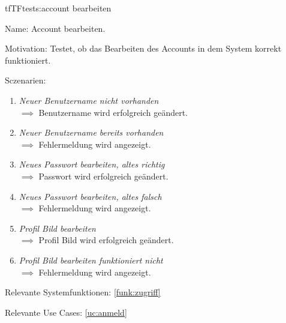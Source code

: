 \begin{description}[leftmargin=5em, style=sameline]

\begin{lhp}{tf}{TF}{tests:account bearbeiten}
	\item [Name:] Account bearbeiten.
	\item [Motivation:] Testet, ob das Bearbeiten des Accounts in dem System korrekt funktioniert.
	\item [Sczenarien:] \hfill
		\begin{enumerate}
			\item \textit{Neuer Benutzername nicht vorhanden} \\ $\implies$ Benutzername wird erfolgreich geändert.
			\item \textit{Neuer Benutzername  bereits vorhanden} \\ $\implies$ Fehlermeldung wird angezeigt.
			\item \textit{Neues Passwort bearbeiten, altes richtig} \\ $\implies$ Passwort wird erfolgreich geändert.
			\item \textit{Neues Passwort bearbeiten, altes falsch} \\ $\implies$ Fehlermeldung wird angezeigt.
			\item \textit{Profil Bild bearbeiten} \\ $\implies$ Profil Bild wird erfolgreich geändert.
			\item \textit{Profil Bild bearbeiten funktioniert nicht} \\ $\implies$ Fehlermeldung wird angezeigt.
		\end{enumerate}
	\item [Relevante Systemfunktionen:] \ref{funk:zugriff}
	\item [Relevante Use Cases:] \ref{uc:anmeld}
\end{lhp}

\end{description}


